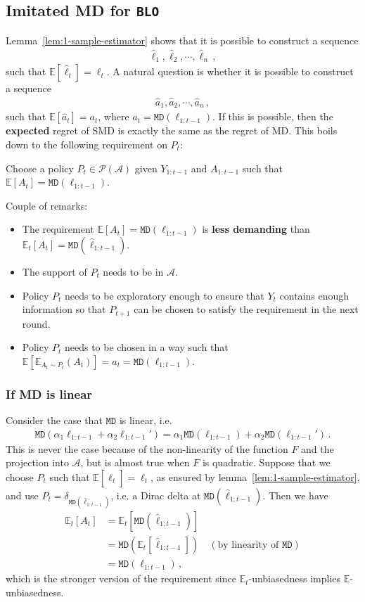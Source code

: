 \documentclass{article}
\theoremstyle{plain}
\theoremstyle{definition}
\newcommand{\E}{\mathbb E}
\newcommand{\cA}{\mathcal A}
\newcommand{\cP}{\mathcal P}
\newcommand{\fmd}{\texttt{MD}}
\newcommand{\mdalg}{\textsf{MD}\xspace}
\newcommand{\smdalg}{\textsf{SMD}\xspace}
\newcommand{\blo}{\texttt{BLO}\xspace}
\newcommand{\hl}{\hat{\ell}\xspace}
\begin{document}
\clearpage
\subsection{Imitated \mdalg for \blo}
Lemma~\ref{lem:1-sample-estimator} shows that it is possible to construct
a sequence
\begin{align*}
    \hl_1, \hl_2, \cdots, \hl_n\,,
\end{align*}
such that $\E[\hl_t] = \ell_t$.
A natural question is whether it is possible to construct a sequence
\begin{align*}
    \hat{a}_1, \hat{a}_2, \cdots, \hat{a}_n\,,
\end{align*}
such that $\E[\hat{a}_t] = a_t$, where $a_t = \fmd(\ell_{1:t-1})$.
If this is possible, then the \textbf{expected} regret of \smdalg is exactly the same as the regret of \mdalg.
This boils down to the following requirement on $P_t$:
\begin{framed}
    Choose a policy $P_t \in \cP(\cA)$ given $Y_{1:t-1}$ and $A_{1:t-1}$ such that
    $\E[A_t] = \fmd(\ell_{1:t-1})$.
\end{framed}
Couple of remarks:
\begin{itemize}
    \item The requirement $\E[A_t] = \fmd(\ell_{1:t-1})$ is \textbf{less demanding} than $\E_t[A_t] = \fmd(\hl_{1:t-1})$.
    \item The support of $P_t$ needs to be in $\cA$.
    \item Policy $P_t$ needs to be exploratory enough to ensure that $Y_t$ contains enough information so that $P_{t+1}$ can be chosen to satisfy the requirement in the next round.
    \item Policy $P_t$ needs to be chosen in a way such that $\E[\E_{A_t \sim P_t}(A_t)] = a_t = \fmd(\ell_{1:t-1})$.
\end{itemize}

\subsubsection{If \mdalg is linear}
Consider the case that $\fmd$ is linear, i.e.
\begin{align*}
    \fmd(\alpha_1 \ell_{1:t-1} + \alpha_2 \ell_{1:t-1}') = \alpha_1 \fmd(\ell_{1:t-1}) + \alpha_2 \fmd(\ell_{1:t-1}')\,.
\end{align*}
This is never the case because of the non-linearity of the function $F$ and the projection into $\cA$, but is almost true when $F$ is quadratic.
Suppose that we choose $P_t$ such that $\E[\hl_t] = \ell_t$, as ensured by lemma~\ref{lem:1-sample-estimator},
and use $P_t = \delta_{\fmd(\hl_{1:t-1})}$, i.e. a Dirac delta at $\fmd(\hl_{1:t-1})$.
Then we have
\begin{align*}
    \E_t[A_t] & = \E_t[\fmd(\hl_{1:t-1})]                                      \\
              & = \fmd(\E_t[\hl_{1:t-1}]) \quad (\text{by linearity of } \fmd) \\
              & = \fmd(\ell_{1:t-1})\,,
\end{align*}
which is the stronger version of the requirement since $\E_t$-unbiasedness implies $\E$-unbiasedness.
\end{document}
